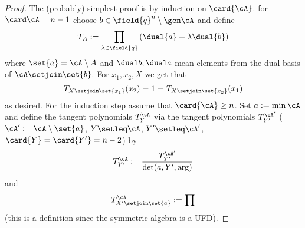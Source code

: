 
\begin{lemma}

\end{lemma}

\begin{proof}
    The (probably) simplest proof is by induction on $\card{\cA}$.
    for $\card\cA=n-1$ choose $b\in \field{q}^n\setminus\gen\cA$ and define
    $$
    T_A:=\prod_{\lambda\in\field{q}}{(\dual{a}+\lambda\dual{b})}
    $$
    where $\set{a}=\cA\setminus A$ and $\dual b, \dual a$ mean elements from the dual basis of $\cA\setjoin\set{b}$. For $x_1,x_2,X$ we get that
    $$
    T_{X\setjoin\set{x_1}}(x_2)=1=T_{X\setjoin\set{x_2}}(x_1)
    $$
    as desired.
        For the induction step assume that $\card{\cA}\geq n$. Set $a:=\min{\cA}$ and define the tangent polynomials $T^{\cA}_Y$ via the tangent polynomials $T^{\cA'}_{Y'}$ ($\cA':=\cA\setminus\set{a}$, $Y\setleq\cA$, $Y'\setleq\cA'$, $\card{Y}=\card{Y'}=n-2$) by
        $$
        T^{\cA}_{Y'}:=\frac{T^{\cA'}_{Y'}}{\det(a,Y',\arg)}
        $$
        and
        $$
        T^{\cA}_{X'\setjoin\set{a}}:=\prod
        $$
        (this is a definition since the symmetric algebra is a UFD).
\end{proof}